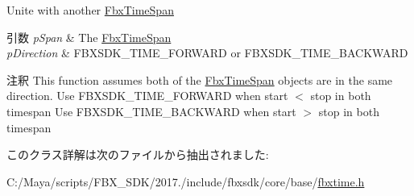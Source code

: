 Unite with another \hyperlink{class_fbx_time_span}{Fbx\+Time\+Span} 
\begin{DoxyParams}{引数}
{\em p\+Span} & The \hyperlink{class_fbx_time_span}{Fbx\+Time\+Span} \\
\hline
{\em p\+Direction} & F\+B\+X\+S\+D\+K\+\_\+\+T\+I\+M\+E\+\_\+\+F\+O\+R\+W\+A\+RD or F\+B\+X\+S\+D\+K\+\_\+\+T\+I\+M\+E\+\_\+\+B\+A\+C\+K\+W\+A\+RD \\
\hline
\end{DoxyParams}
\begin{DoxyRemark}{注釈}
This function assumes both of the \hyperlink{class_fbx_time_span}{Fbx\+Time\+Span} objects are in the same direction. Use F\+B\+X\+S\+D\+K\+\_\+\+T\+I\+M\+E\+\_\+\+F\+O\+R\+W\+A\+RD when start $<$ stop in both timespan Use F\+B\+X\+S\+D\+K\+\_\+\+T\+I\+M\+E\+\_\+\+B\+A\+C\+K\+W\+A\+RD when start $>$ stop in both timespan 
\end{DoxyRemark}


このクラス詳解は次のファイルから抽出されました\+:\begin{DoxyCompactItemize}
\item 
C\+:/\+Maya/scripts/\+F\+B\+X\+\_\+\+S\+D\+K/2017./include/fbxsdk/core/base/\hyperlink{fbxtime_8h}{fbxtime.\+h}\end{DoxyCompactItemize}
